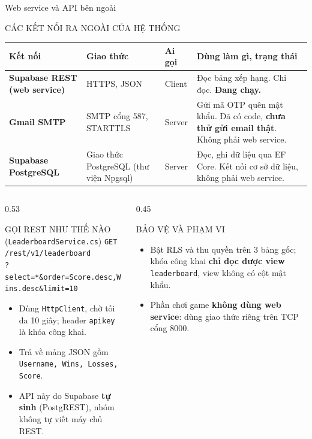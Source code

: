 \documentclass[aspectratio=169,9pt]{beamer}
\newenvironment{haicot}[1]{\begin{columns}[T,onlytextwidth]\begin{column}{#1\textwidth}}{\end{column}\end{columns}}
\newcommand{\sang}[1]{\end{column}\begin{column}{#1\textwidth}}
\begin{document}
\begin{frame}[t,label=webapi]{Web service và API bên ngoài}
  \begin{khung}{CÁC KẾT NỐI RA NGOÀI CỦA HỆ THỐNG}
    \renewcommand{\arraystretch}{1.15}
    \begin{tabularx}{\linewidth}{@{}>{\bfseries}p{3.1cm} p{2.5cm} p{1.1cm} Y@{}}
      \toprule \normalfont\textbf{Kết nối} & \textbf{Giao thức} & \textbf{Ai gọi} & \textbf{Dùng làm gì, trạng thái} \\ \midrule
      Supabase REST \newline (web service) & HTTPS, JSON & Client & Đọc bảng xếp hạng. Chỉ đọc. \textbf{Đang chạy.} \\
      Gmail SMTP & SMTP cổng 587, STARTTLS & Server & Gửi mã OTP quên mật khẩu. Đã có code, \textbf{chưa thử gửi email thật}. Không phải web service. \\
      Supabase PostgreSQL & Giao thức PostgreSQL (thư viện Npgsql) & Server & Đọc, ghi dữ liệu qua EF Core. Kết nối cơ sở dữ liệu, không phải web service. \\
      \bottomrule
    \end{tabularx}
  \end{khung}
  \begin{haicot}{0.53}
    \begin{khung}[equal height group=api]{GỌI REST NHƯ THẾ NÀO (\texttt{LeaderboardService.cs})}
      \texttt{GET /rest/v1/leaderboard}\\
      \texttt{?select=*\&order=Score.desc,Wins.desc\&limit=10}
      \begin{itemize}\setlength{\itemsep}{1pt}
        \item Dùng \texttt{HttpClient}, chờ tối đa 10 giây; header \texttt{apikey} là khóa công khai.
        \item Trả về mảng JSON gồm \texttt{Username, Wins, Losses, Score}.
        \item API này do Supabase \textbf{tự sinh} (PostgREST), nhóm không tự viết máy chủ REST.
      \end{itemize}
    \end{khung}
  \sang{0.45}
    \begin{luuy}[equal height group=api]{BẢO VỆ VÀ PHẠM VI}
      \begin{itemize}\setlength{\itemsep}{1pt}
        \item Bật RLS và thu quyền trên 3 bảng gốc; khóa công khai \textbf{chỉ đọc được view} \texttt{leaderboard}, view không có cột mật khẩu.
        \item Phần chơi game \textbf{không dùng web service}: dùng giao thức riêng trên TCP cổng 8000.
      \end{itemize}
    \end{luuy}
  \end{haicot}
\end{frame}
\end{document}
